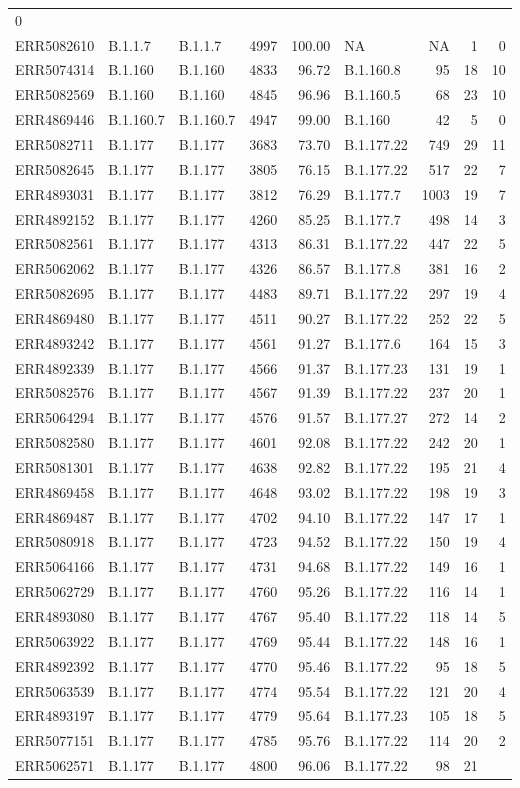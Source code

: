 \documentclass[
]{article}
\begin{document}
\begin{longtable}[]{@{}lllrrlrrr@{}}
0\tabularnewline
ERR5082610 & B.1.1.7 & B.1.1.7 & 4997 & 100.00 & NA & NA & 1 &
0\tabularnewline
ERR5074314 & B.1.160 & B.1.160 & 4833 & 96.72 & B.1.160.8 & 95 & 18 &
10\tabularnewline
ERR5082569 & B.1.160 & B.1.160 & 4845 & 96.96 & B.1.160.5 & 68 & 23 &
10\tabularnewline
ERR4869446 & B.1.160.7 & B.1.160.7 & 4947 & 99.00 & B.1.160 & 42 & 5 &
0\tabularnewline
ERR5082711 & B.1.177 & B.1.177 & 3683 & 73.70 & B.1.177.22 & 749 & 29 &
11\tabularnewline
ERR5082645 & B.1.177 & B.1.177 & 3805 & 76.15 & B.1.177.22 & 517 & 22 &
7\tabularnewline
ERR4893031 & B.1.177 & B.1.177 & 3812 & 76.29 & B.1.177.7 & 1003 & 19 &
7\tabularnewline
ERR4892152 & B.1.177 & B.1.177 & 4260 & 85.25 & B.1.177.7 & 498 & 14 &
3\tabularnewline
ERR5082561 & B.1.177 & B.1.177 & 4313 & 86.31 & B.1.177.22 & 447 & 22 &
5\tabularnewline
ERR5062062 & B.1.177 & B.1.177 & 4326 & 86.57 & B.1.177.8 & 381 & 16 &
2\tabularnewline
ERR5082695 & B.1.177 & B.1.177 & 4483 & 89.71 & B.1.177.22 & 297 & 19 &
4\tabularnewline
ERR4869480 & B.1.177 & B.1.177 & 4511 & 90.27 & B.1.177.22 & 252 & 22 &
5\tabularnewline
ERR4893242 & B.1.177 & B.1.177 & 4561 & 91.27 & B.1.177.6 & 164 & 15 &
3\tabularnewline
ERR4892339 & B.1.177 & B.1.177 & 4566 & 91.37 & B.1.177.23 & 131 & 19 &
1\tabularnewline
ERR5082576 & B.1.177 & B.1.177 & 4567 & 91.39 & B.1.177.22 & 237 & 20 &
1\tabularnewline
ERR5064294 & B.1.177 & B.1.177 & 4576 & 91.57 & B.1.177.27 & 272 & 14 &
2\tabularnewline
ERR5082580 & B.1.177 & B.1.177 & 4601 & 92.08 & B.1.177.22 & 242 & 20 &
1\tabularnewline
ERR5081301 & B.1.177 & B.1.177 & 4638 & 92.82 & B.1.177.22 & 195 & 21 &
4\tabularnewline
ERR4869458 & B.1.177 & B.1.177 & 4648 & 93.02 & B.1.177.22 & 198 & 19 &
3\tabularnewline
ERR4869487 & B.1.177 & B.1.177 & 4702 & 94.10 & B.1.177.22 & 147 & 17 &
1\tabularnewline
ERR5080918 & B.1.177 & B.1.177 & 4723 & 94.52 & B.1.177.22 & 150 & 19 &
4\tabularnewline
ERR5064166 & B.1.177 & B.1.177 & 4731 & 94.68 & B.1.177.22 & 149 & 16 &
1\tabularnewline
ERR5062729 & B.1.177 & B.1.177 & 4760 & 95.26 & B.1.177.22 & 116 & 14 &
1\tabularnewline
ERR4893080 & B.1.177 & B.1.177 & 4767 & 95.40 & B.1.177.22 & 118 & 14 &
5\tabularnewline
ERR5063922 & B.1.177 & B.1.177 & 4769 & 95.44 & B.1.177.22 & 148 & 16 &
1\tabularnewline
ERR4892392 & B.1.177 & B.1.177 & 4770 & 95.46 & B.1.177.22 & 95 & 18 &
5\tabularnewline
ERR5063539 & B.1.177 & B.1.177 & 4774 & 95.54 & B.1.177.22 & 121 & 20 &
4\tabularnewline
ERR4893197 & B.1.177 & B.1.177 & 4779 & 95.64 & B.1.177.23 & 105 & 18 &
5\tabularnewline
ERR5077151 & B.1.177 & B.1.177 & 4785 & 95.76 & B.1.177.22 & 114 & 20 &
2\tabularnewline
ERR5062571 & B.1.177 & B.1.177 & 4800 & 96.06 & B.1.177.22 & 98 & 21 &

\end{longtable}
\end{document}
